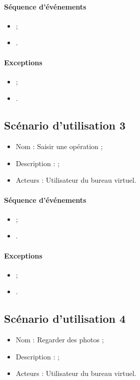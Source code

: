 \paragraph{Séquence d'événements}
\begin{itemize}
	\item ;
	\item .
\end{itemize}

\paragraph{Exceptions}
\begin{itemize}
	\item ;
	\item .
\end{itemize}


\subsection{Scénario d'utilisation 3}
\begin{itemize}
	\item Nom : Saisir une opération ;
	\item Description :  ;
	\item Acteurs : Utilisateur du bureau virtuel.
\end{itemize}

\paragraph{Séquence d'événements}
\begin{itemize}
	\item ;
	\item .
\end{itemize}

\paragraph{Exceptions}
\begin{itemize}
	\item ;
	\item .
\end{itemize}


\subsection{Scénario d'utilisation 4}
\begin{itemize}
	\item Nom : Regarder des photos ;
	\item Description :  ;
	\item Acteurs : Utilisateur du bureau virtuel.
\end{itemize}

